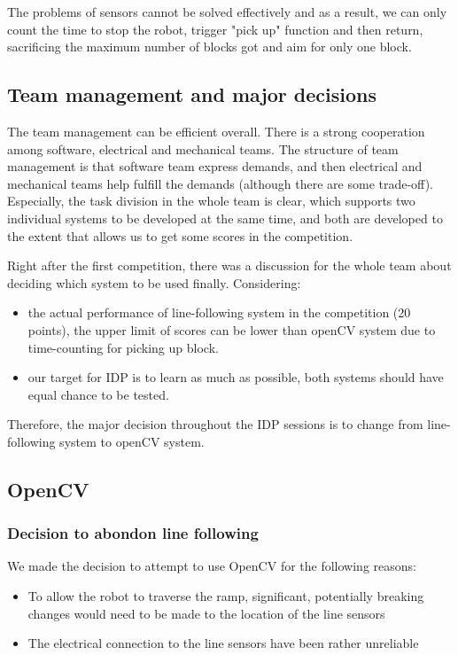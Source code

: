 \documentclass{article}
\begin{document}
The problems of sensors cannot be solved effectively and as a result, we can only count the time to stop the robot, trigger "pick up" function and then return, sacrificing the maximum number of blocks got and aim for only one block.

\subsection{Team management and major decisions}
The team management can be efficient overall. There is a strong cooperation among software, electrical and mechanical teams. The structure of team management is that software team express demands, and then electrical and mechanical teams help fulfill the demands (although there are some trade-off). Especially, the task division in the whole team is clear, which supports two individual systems to be developed at the same time, and both are developed to the extent that allows us to get some scores in the competition.

Right after the first competition, there was a discussion for the whole team about deciding which system to be used finally.
Considering:

\begin{itemize}
    \item the actual performance of line-following system in the competition (20 points), the upper limit of scores can be lower than openCV system due to time-counting for picking up block.
    \item our target for IDP is to learn as much as possible, both systems should have equal chance to be tested.
\end{itemize}
Therefore, the major decision throughout the IDP sessions is to change from line-following system to openCV system.


\subsection{OpenCV}
\subsubsection{Decision to abondon line following}
We made the decision to attempt to use OpenCV for the following reasons:

\begin{itemize}
    \item To allow the robot to traverse the ramp, significant, potentially breaking changes would need to be made to the location of the line sensors
    \item The electrical connection to the line sensors have been rather unreliable
\end{itemize}
\end{document}
